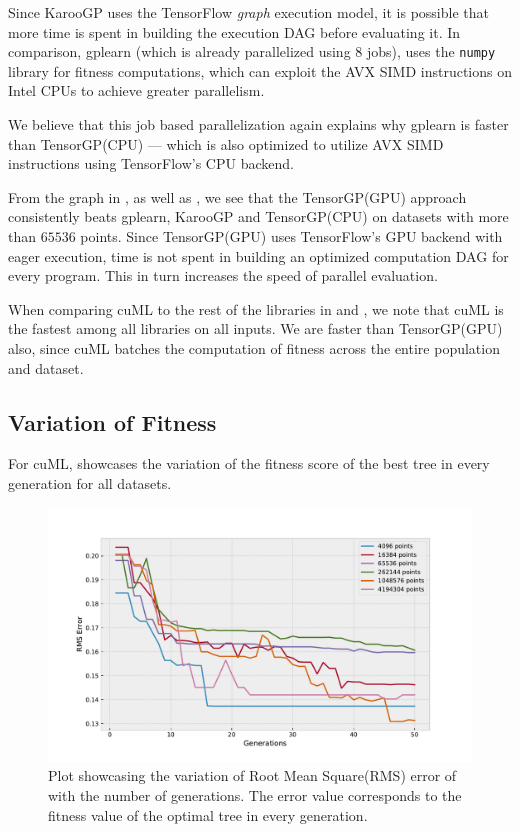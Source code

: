 Since KarooGP uses the TensorFlow \textit{graph} execution model, it is possible that more time is spent in building the execution DAG before evaluating it. In comparison, gplearn (which is already parallelized using $8$ jobs), uses the \lstinline!numpy! library for fitness computations, which can exploit the AVX SIMD instructions on Intel CPUs to achieve greater parallelism. 

We believe that this job based parallelization again explains why gplearn is faster than TensorGP(CPU) --- which is also optimized to utilize AVX SIMD instructions using TensorFlow's CPU backend.

From the graph in , as well as , we see that the TensorGP(GPU) approach consistently beats gplearn, KarooGP and TensorGP(CPU) on datasets with more than $65536$ points. Since TensorGP(GPU) uses TensorFlow's GPU backend with eager execution, time is not spent in building an optimized computation DAG for every program. This in turn increases the speed of parallel evaluation.

When comparing cuML to the rest of the libraries in  and , we note that cuML is the fastest among all libraries on all inputs. We are faster than TensorGP(GPU) also, since cuML batches the computation of fitness across the entire population and dataset. 

\subsection{Variation of Fitness}
\label{subsec:fitnessvar}


For cuML,  showcases the variation of the fitness score of the best tree in every generation for all datasets. 

\begin{figure}[htbp]
  \centering
  \includegraphics[scale=0.59]{images/RMSError.pdf}
  \caption{Plot showcasing the variation of Root Mean Square(RMS) error of with the number of generations. The error value corresponds to the fitness value of the optimal tree in every generation. }
  \label{fig:besttrainfit}
\end{figure}

